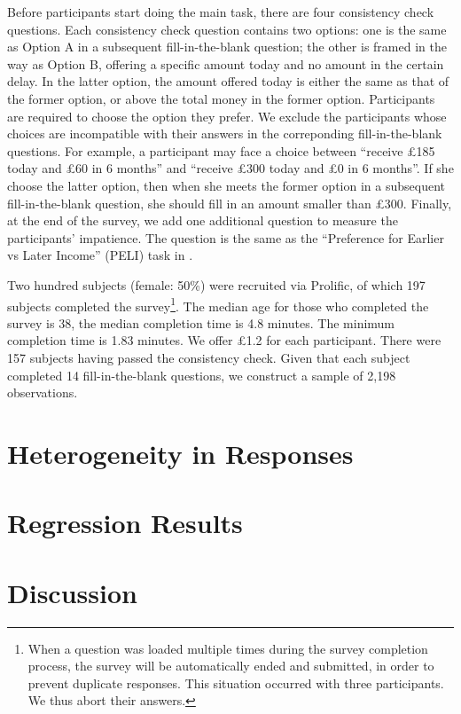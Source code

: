 \documentclass[
  12pt,
]{article}
\begin{document}
Before participants start doing the main task, there are four
consistency check questions. Each consistency check question contains
two options: one is the same as Option A in a subsequent
fill-in-the-blank question; the other is framed in the way as Option B,
offering a specific amount today and no amount in the certain delay. In
the latter option, the amount offered today is either the same as that
of the former option, or above the total money in the former option.
Participants are required to choose the option they prefer. We exclude
the participants whose choices are incompatible with their answers in
the correponding fill-in-the-blank questions. For example, a participant
may face a choice between ``receive £185 today and £60 in 6 months'' and
``receive £300 today and £0 in 6 months''. If she choose the latter
option, then when she meets the former option in a subsequent
fill-in-the-blank question, she should fill in an amount smaller than
£300. Finally, at the end of the survey, we add one additional question
to measure the participants' impatience. The question is the same as the
``Preference for Earlier vs Later Income'' (PELI) task in
\citet{burro2022patience}.

Two hundred subjects (female: 50\%) were recruited via Prolific, of
which 197 subjects completed the survey\footnote{When a question was
  loaded multiple times during the survey completion process, the survey
  will be automatically ended and submitted, in order to prevent
  duplicate responses. This situation occurred with three participants.
  We thus abort their answers.}. The median age for those who completed
the survey is 38, the median completion time is 4.8 minutes. The minimum
completion time is 1.83 minutes. We offer £1.2 for each participant.
There were 157 subjects having passed the consistency check. Given that
each subject completed 14 fill-in-the-blank questions, we construct a
sample of 2,198 observations.

\hypertarget{heterogeneity-in-responses}{%
\section{Heterogeneity in Responses}\label{heterogeneity-in-responses}}

\hypertarget{regression-results}{%
\section{Regression Results}\label{regression-results}}



\hypertarget{discussion}{%
\section{Discussion}\label{discussion}}

\renewcommand\refname{Reference}
  
\end{document}
